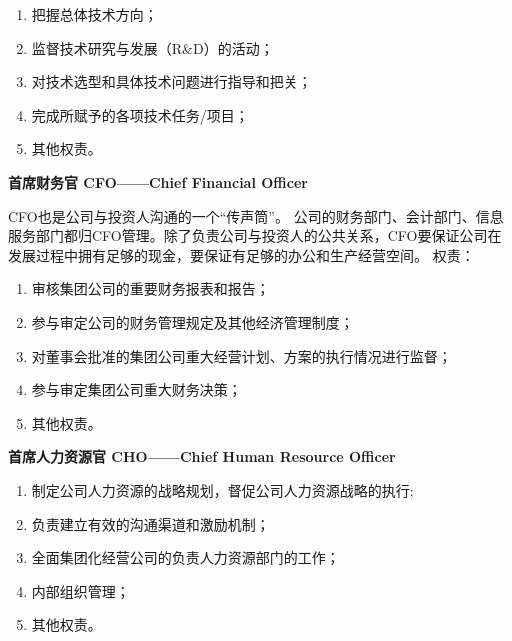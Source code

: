 \documentclass[UTF8,12pt]{ctexart}
\numberwithin{figure}{section}%
\begin{document}
\begin{spacing}{2}
\begin{enumerate}
	\item 把握总体技术方向；
	
	\item 监督技术研究与发展（R\&D）的活动；
	
	\item 对技术选型和具体技术问题进行指导和把关；
	
	\item 完成所赋予的各项技术任务/项目；
	
	\item 其他权责。
	
\end{enumerate}

\textbf{首席财务官 CFO——Chief Financial Officer}

CFO也是公司与投资人沟通的一个“传声筒”。 公司的财务部门、会计部门、信息服务部门都归CFO管理。除了负责公司与投资人的公共关系，CFO要保证公司在发展过程中拥有足够的现金，要保证有足够的办公和生产经营空间。
权责：

\begin{enumerate}
	\item 审核集团公司的重要财务报表和报告；
	
	\item 参与审定公司的财务管理规定及其他经济管理制度；
	
	\item 对董事会批准的集团公司重大经营计划、方案的执行情况进行监督；
	
	\item 参与审定集团公司重大财务决策；
	
	\item 其他权责。
	
\end{enumerate}

\textbf{首席人力资源官 CHO——Chief Human Resource Officer}

\begin{enumerate}
	\item 制定公司人力资源的战略规划，督促公司人力资源战略的执行;
	
	\item 负责建立有效的沟通渠道和激励机制；
	 
	\item 全面集团化经营公司的负责人力资源部门的工作；
	
	\item 内部组织管理；
	
	\item 其他权责。
		
\end{enumerate}


\end{spacing}
\end{document}
